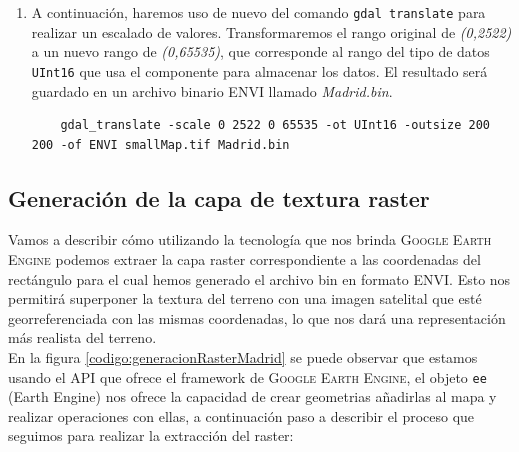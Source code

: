 \documentclass[a4paper, 11pt]{book}
\begin{document}
\begin{enumerate}
    \item A continuación, haremos uso de nuevo del comando \texttt{gdal translate} para realizar un escalado de valores. Transformaremos el rango original de \emph{(0,2522)} a un nuevo rango de \emph{(0,65535)}, que corresponde al rango del tipo de datos \texttt{UInt16} que usa el componente para almacenar los datos. El resultado será guardado en un archivo binario \textsc{ENVI} llamado \emph{Madrid.bin}.

    {\scriptsize
    \begin{verbatim}
    gdal_translate -scale 0 2522 0 65535 -ot UInt16 -outsize 200 200 -of ENVI smallMap.tif Madrid.bin
    \end{verbatim}
    }
\end{enumerate}

\subsection{Generación de la capa de textura raster}
\label{sec:raster}
Vamos a describir cómo utilizando la tecnología que nos brinda \textsc{Google Earth Engine} podemos extraer la capa raster correspondiente a las coordenadas del rectángulo para el cual hemos generado el archivo bin en formato \textsc{ENVI}. Esto nos permitirá superponer la textura del terreno con una imagen satelital que esté georreferenciada con las mismas coordenadas, lo que nos dará una representación más realista del terreno.\\
En la figura \ref{codigo:generacionRasterMadrid} se puede observar que estamos usando el \textsc{API} que ofrece el framework de \textsc{Google Earth Engine}, el objeto \texttt{ee} (Earth Engine) nos ofrece la capacidad de crear geometrias añadirlas al mapa y realizar operaciones con ellas, a continuación paso a describir el proceso que seguimos para realizar la extracción del raster:
\end{document}
